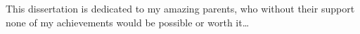 
\begin{dedication} 

This dissertation is dedicated to my amazing parents, who without their support none of my achievements would be possible or worth it\dots

\end{dedication}

